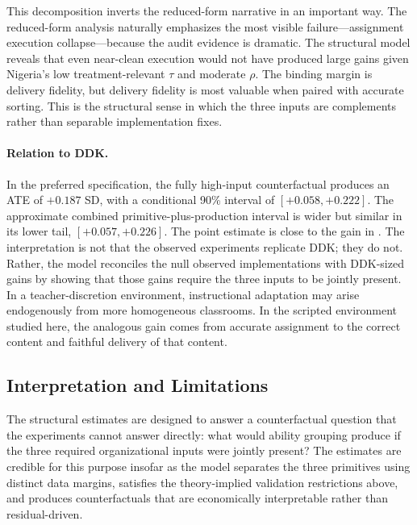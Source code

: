 \documentclass[11pt]{article}
\begin{document}
This decomposition inverts the reduced-form narrative in an important way. The reduced-form analysis naturally emphasizes the most visible failure---assignment execution collapse---because the audit evidence is dramatic. The structural model reveals that even near-clean execution would not have produced large gains given Nigeria's low treatment-relevant $\tau$ and moderate $\rho$. The binding margin is delivery fidelity, but delivery fidelity is most valuable when paired with accurate sorting. This is the structural sense in which the three inputs are complements rather than separable implementation fixes.

\paragraph{Relation to DDK.} In the preferred specification, the fully high-input counterfactual produces an ATE of $+0.187$ SD, with a conditional 90\% interval of $[+0.058,+0.222]$. The approximate combined primitive-plus-production interval is wider but similar in its lower tail, $[+0.057,+0.226]$. The point estimate is close to the gain in \citet{duflo2011peer}. The interpretation is not that the observed experiments replicate DDK; they do not. Rather, the model reconciles the null observed implementations with DDK-sized gains by showing that those gains require the three inputs to be jointly present. In a teacher-discretion environment, instructional adaptation may arise endogenously from more homogeneous classrooms. In the scripted environment studied here, the analogous gain comes from accurate assignment to the correct content and faithful delivery of that content.

\subsection{Interpretation and Limitations}
\label{subsec:struct_limits}

The structural estimates are designed to answer a counterfactual question that the experiments cannot answer directly: what would ability grouping produce if the three required organizational inputs were jointly present? The estimates are credible for this purpose insofar as the model separates the three primitives using distinct data margins, satisfies the theory-implied validation restrictions above, and produces counterfactuals that are economically interpretable rather than residual-driven.
\end{document}
